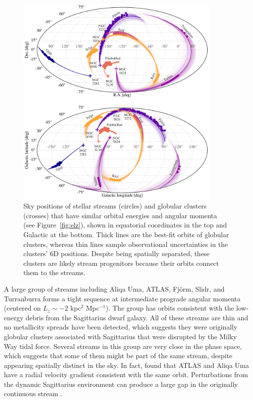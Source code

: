 \documentclass[twocolumn]{aastex63}
\begin{document}
\begin{figure}
\begin{center}
\includegraphics[width=0.9\textwidth]{sky_orbits.pdf}
\end{center}
\caption{
Sky positions of stellar streams (circles) and globular clusters (crosses) that have similar orbital energies and angular momenta (see Figure~\ref{fig:elz}), shown in equatorial coordinates in the top and Galactic at the bottom.
Thick lines are the best-fit orbits of globular clusters, whereas thin lines sample observational uncertainties in the clusters' 6D positions.
Despite being spatially separated, these clusters are likely stream progenitors because their orbits connect them to the streams.
}
\label{fig:sky}
\end{figure}

A large group of streams including Aliqa Uma, ATLAS, Fj\" orm, Slidr, and Turranburra forms a tight sequence at intermediate prograde angular momenta (centered on $L_z\sim-2$ kpc$^2$ Mpc$^{-1}$).
The group has orbits consistent with the low-energy debris from the Sagittarius dwarf galaxy.
All of these streams are thin and no metallicity spreads have been detected, which suggests they were originally globular clusters associated with Sagittarius that were disrupted by the Milky Way tidal force.
Several streams in this group are very close in the phase space, which suggests that some of them might be part of the same stream, despite appearing spatially distinct in the sky.
In fact, \citet{li2020} found that ATLAS and Aliqa Uma have a radial velocity gradient consistent with the same orbit.
Perturbations from the dynamic Sagittarius environment can produce a large gap in the originally continuous stream \citep{bonaca2020b, deboer2020}.
\end{document}
